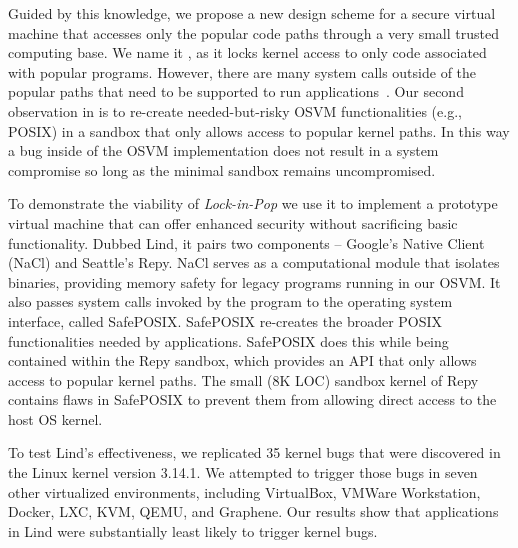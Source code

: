 Guided by this knowledge, we propose a new design scheme for a secure virtual machine that
accesses only the popular code paths through a very small trusted computing base.
We name it \lip, as it locks kernel access to only code
associated with popular programs. %
However, there are many system calls outside of the popular paths that need to 
be supported to run applications~\cite{tsai2016study}.  Our second
observation in \lip is to re-create needed-but-risky OSVM functionalities
(e.g., POSIX) in a 
sandbox that only allows access to popular kernel paths.  In this way a bug
inside of the OSVM implementation does not result in a system compromise
so long as the minimal sandbox remains uncompromised.


To demonstrate the viability of \emph{Lock-in-Pop} we use it to implement a 
prototype virtual machine that can offer enhanced security without sacrificing
 basic functionality. Dubbed Lind, it pairs two components -- Google's Native Client
(NaCl) and Seattle's Repy. NaCl serves as a computational module that isolates
binaries, providing memory
safety for legacy programs running in our OSVM. It also passes system calls
invoked by the program to the operating system interface, called SafePOSIX. 
SafePOSIX re-creates the broader POSIX functionalities needed by applications.
SafePOSIX does this while being contained within the Repy sandbox, which
provides an API that only allows access to popular kernel paths.  The small 
(8K LOC) sandbox kernel of Repy contains flaws in SafePOSIX 
to prevent them from allowing direct access to the host OS kernel.


To test Lind's effectiveness, we replicated 35 kernel bugs that were
discovered in the Linux kernel version 3.14.1.  We attempted to trigger those
bugs in seven other virtualized environments,
including VirtualBox, VMWare Workstation, Docker, LXC, KVM, QEMU, and Graphene.
Our results show that applications in Lind were substantially least likely to trigger 
kernel bugs. 


